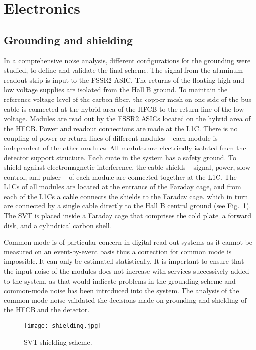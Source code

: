 \section{Electronics}

\subsection{Grounding and shielding}

In a comprehensive noise analysis, different configurations for the grounding were studied, to define and validate the final scheme. The signal from the aluminum readout strip is input to the FSSR2 ASIC. The returns of the floating high and low voltage supplies are isolated from the Hall B ground. To maintain the reference voltage level of the carbon fiber, the copper mesh on one side of the bus cable is connected at the hybrid area of the HFCB to the return line of the low voltage. Modules are read out by the FSSR2 ASICs located on the hybrid area of the HFCB. Power and readout connections are made at the L1C. There is no coupling of power or return lines of different modules -- each module is independent of the other modules. All modules are electrically isolated from the detector support structure. 
Each crate in the system has a safety ground. To shield against electromagnetic interference, the cable shields -- signal, power, slow control, and pulser -- of each module are connected together at the L1C. The L1Cs of all modules are located at the entrance of the Faraday cage, and from each of the L1Cs a cable connects the shields to the Faraday cage, which in turn are connected by a single cable directly to the Hall B central ground (see Fig.~\ref{fig:shielding}). The SVT is placed inside a Faraday cage that comprises the cold plate, a forward disk, and a cylindrical carbon shell. 

Common mode is of particular concern in digital read-out systems as it cannot be measured on an event-by-event basis thus a correction for common mode is impossible. It can only be estimated statistically. It is important to ensure that the input noise of the modules does not increase with services successively added to the system, as that would indicate problems in the grounding scheme and common-mode noise has been introduced into the system. The analysis of the common mode noise validated the decisions made on grounding and shielding of the HFCB and the detector.

\begin{figure}[hbt] 
\centering 
\texttt{[image: shielding.jpg]}
\caption{SVT shielding scheme.}
\label{fig:shielding}
\end{figure}

